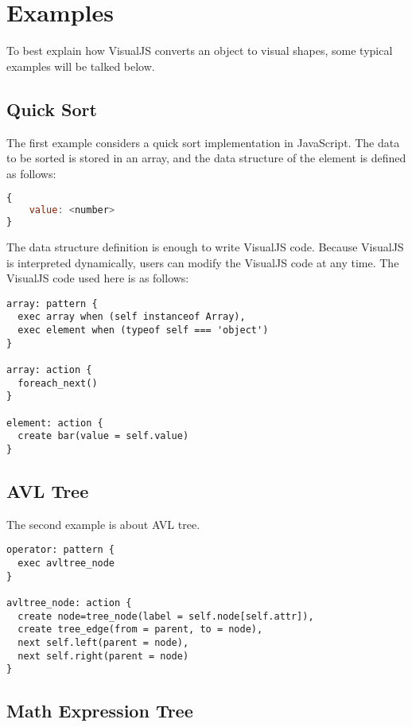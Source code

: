 \chapter {Examples}
To best explain how VisualJS converts an object to visual shapes, some typical examples will be talked below.

\section {Quick Sort}

The first example considers a quick sort implementation in JavaScript. The data to be sorted is stored in an array, and the data structure of the element is defined as follows:

\begin{lstlisting}[language=JavaScript]
{
	value: <number>
}
\end{lstlisting}

The data structure definition is enough to write VisualJS code. Because VisualJS is interpreted dynamically, users can modify the VisualJS code at any time. The VisualJS code used here is as follows:

\begin{lstlisting}
array: pattern {
  exec array when (self instanceof Array),
  exec element when (typeof self === 'object')
}

array: action {
  foreach_next()
}

element: action {
  create bar(value = self.value)
}
\end{lstlisting}

\section {AVL Tree}

The second example is about AVL tree.

\begin{lstlisting}
operator: pattern {
  exec avltree_node
}

avltree_node: action {
  create node=tree_node(label = self.node[self.attr]),
  create tree_edge(from = parent, to = node),
  next self.left(parent = node),
  next self.right(parent = node)
}
\end{lstlisting}

\section {Math Expression Tree}

